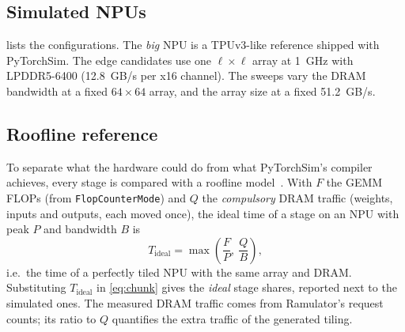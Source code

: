 \subsection{Simulated NPUs}
\label{subsec:method-npus}

 lists the configurations. The \emph{big} NPU is a TPUv3-like reference shipped with PyTorchSim. The edge candidates use one $\ell\times\ell$ array at 1~GHz with LPDDR5-6400 (12.8~GB/s per x16 channel). The sweeps vary the DRAM bandwidth at a fixed $64\times64$ array, and the array size at a fixed 51.2~GB/s.

\begin{table}[tp]
\centering
\small
\caption{Simulated NPU configurations (fp32 peak; ridge point = peak FLOP/s over DRAM bandwidth).}
\label{tab:npus}
\setlength{\tabcolsep}{4pt}
\end{table}

\subsection{Roofline reference}
\label{subsec:method-roofline}

To separate what the hardware could do from what PyTorchSim's compiler achieves, every stage is compared with a roofline model~\cite{10.1145/1498765.1498785}. With $F$ the GEMM FLOPs (from \texttt{FlopCounterMode}) and $Q$ the \emph{compulsory} DRAM traffic (weights, inputs and outputs, each moved once), the ideal time of a stage on an NPU with peak $P$ and bandwidth $B$ is
\begin{equation}
  T_\text{ideal} = \max\!\left(\frac{F}{P},\ \frac{Q}{B}\right),
  \label{eq:ideal}
\end{equation}
i.e.\ the time of a perfectly tiled NPU with the same array and DRAM. Substituting $T_\text{ideal}$ in \cref{eq:chunk} gives the \emph{ideal} stage shares, reported next to the simulated ones. The measured DRAM traffic comes from Ramulator's request counts; its ratio to $Q$ quantifies the extra traffic of the generated tiling.

